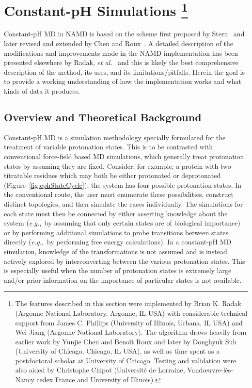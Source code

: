 \newcommand{\pKa}{\text{p}K_{\text{a}}}
\newcommand{\pKaX}[1]{\text{p}K_{\text{a}}^{\text{#1}}}

\section{
Constant-pH Simulations
\footnote[1]{
The features described in this section were implemented by Brian K. Radak 
  (Argonne National Laboratory, Argonne, IL USA) with considerable technical 
  support from James C. Phillips (University of Illinois, Urbana, IL USA) and
  Wei Jiang (Argonne National Laboratory).
The algorithm draws heavily from earlier work by Yunjie Chen and Beno{\^i}t
  Roux and later by Donghyuk Suh (University of Chicago, Chicago, IL USA), as
  well as time spent as a postdoctoral scholar at University of Chicago.
Testing and validation were also aided by Christophe Chipot
  (Universit\'{e} de Lorraine, Vand{\oe}uvre-l\`{e}s-Nancy cedex France and
  University of Illinois).
}
}
\label{section:constantph}

Constant-pH MD in NAMD is based on the scheme first proposed by
  Stern~\cite{Stern_JChemPhys_2007_v126_p164112} and later revised and extended
  by Chen and Roux~\cite{Chen_JChemTheoryComput_2015_v11_p3919}.
A detailed description of the modifications and improvements made in the NAMD
  implementation has been presented elsewhere by Radak,
  \textit{et al.}~\cite{Radak_JChemTheoryComput_2017_v13_p5933} and this is likely the
  best comprehensive description of the method, its uses, and its limitations/pitfalls.
Herein the goal is to provide a working understanding of how the implementation
  works and what kinds of data it produces.

\subsection{Overview and Theoretical Background}

Constant-pH MD is a simulation methodology specially formulated for the
  treatment of variable protonation states.
This is to be contrasted with conventional force-field based MD simulations,
  which generally treat protonation states by assuming they are fixed.
Consider, for example, a protein with two titratable residues which may both be
  either protonated or deprotonated (Figure~\ref{fig:cphStateCycle});
the system has four possible protonation states.
In the conventional route, the user must enumerate these possibilities,
  construct distinct topologies, and then simulate the cases individually.
The simulations for each state must then be connected by either asserting
  knowledge about the system (\textit{e.g.},~by assuming that only certain
  states are of biological importance) or by performing additional simulations
  to probe transitions between states directly (\textit{e.g.},~by performing
  free energy calculations).
In a constant-pH MD simulation, knowledge of the transformations is not
  assumed and is instead actively explored by interconverting between the
  various protonation states.
This is especially useful when the number of protonation states is extremely
  large and/or prior information on the importance of particular states is
  not available.

